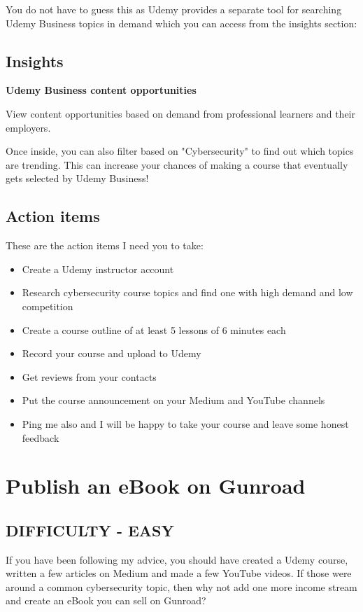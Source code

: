 \documentclass[11pt]{article}
\begin{document}
You do not have to guess this as Udemy provides a separate tool for searching Udemy Business topics in demand which you can access from the insights section:

\subsection*{Insights}
\textbf{Udemy Business content opportunities}

View content opportunities based on demand from professional learners and their employers.

Once inside, you can also filter based on "Cybersecurity" to find out which topics are trending. This can increase your chances of making a course that eventually gets selected by Udemy Business!

\subsection*{Action items}
These are the action items I need you to take:

\begin{itemize}
\item Create a Udemy instructor account
\item Research cybersecurity course topics and find one with high demand and low competition
\item Create a course outline of at least 5 lessons of 6 minutes each
\item Record your course and upload to Udemy
\item Get reviews from your contacts
\item Put the course announcement on your Medium and YouTube channels
\item Ping me also and I will be happy to take your course and leave some honest feedback
\end{itemize}

\section*{Publish an eBook on Gunroad}
\subsection*{DIFFICULTY - EASY}
If you have been following my advice, you should have created a Udemy course, written a few articles on Medium and made a few YouTube videos. If those were around a common cybersecurity topic, then why not add one more income stream and create an eBook you can sell on Gunroad?
\end{document}
